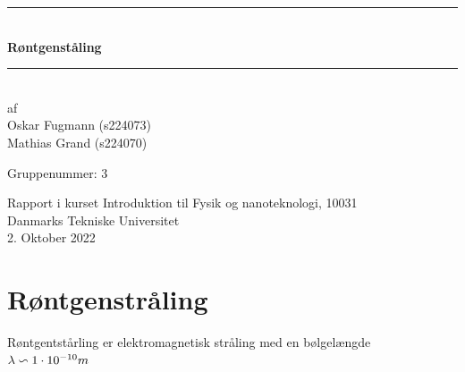 \documentclass[a4paper,twoside]{article}
\begin{document}
\begin{titlepage}
\centering
\rule{\textwidth}{1mm}\\
\vspace{1cm}
\Huge\bfseries Røntgenståling\\
\vspace{0.7cm}
\rule{\textwidth}{1mm}\\
\vspace{3cm}
\large af\\
Oskar Fugmann (s224073)\\
Mathias Grand (s224070)\\


\vspace{0.7cm}


Gruppenummer: 3
\normalsize
\begin{flushleft}
Rapport i kurset Introduktion til Fysik og nanoteknologi, 10031\\
Danmarks Tekniske Universitet\\
2. Oktober 2022
\end{flushleft}
\end{titlepage}

\tableofcontents
\thispagestyle{empty} 
\newpage %

\section{Røntgenstråling}
\setcounter{page}{1} 

Røntgentstårling er elektromagnetisk stråling med en bølgelængde\
$\lambda \backsim 1\cdot 10^{-10}m\\$
\end{document}

